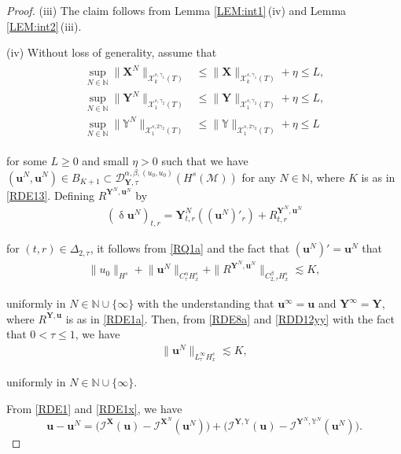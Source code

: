 \documentclass[letterpaper, 11pt,  reqno]{amsart}
\newcommand{\1}{\hspace{0.5mm}\textup{I}\hspace{0.5mm}}
\newcommand{\I}{\mathcal{I}}
\newcommand{\noi}{\noindent}
\newcommand{\D}{\mathcal{D}}
\newcommand{\al}{\alpha}
\newcommand{\be}{\beta}
\newcommand{\updl}{\updelta}
\newcommand{\Dl}{\Delta}
\newcommand{\g}{\gamma}
\newcommand{\les}{\lesssim}
\newcommand{\M}{\mathcal{M}}
\newcommand{\N}{\mathbb{N}}
\newcommand{\cX}{\mathcal{X}}
\newcommand{\uu}{\mathbf{u}}
\newcommand{\YYb}{\mathbb{Y}}
\newcommand{\XX}{\mathbf{X}}
\newcommand{\YY}{\mathbf{Y}}
\numberwithin{equation}{section}
\numberwithin{theorem}{section}
\begin{document}
\begin{proof}
\medskip


\noi
(iii) 
The claim follows from 
Lemma \ref{LEM:int1}\,(iv)
and Lemma \ref{LEM:int2}\,(iii).







\medskip




\noi
(iv) 
Without loss of generality, assume that 
\begin{align}
\begin{split}
\sup_{N \in \N} \|\XX^N\|_{\cX^{s, \g_1}_k(T)} & \le \|\XX\|_{\cX^{s, \g_1}_k(T)} + \eta
\le L, \\
\sup_{N \in \N}  \| \YY^N\|_{\cX^{s, \g_2}_1(T)}
&  \le  \| \YY\|_{\cX^{s, \g_2}_1(T)} + \eta
\le L,\\
\sup_{N \in \N}   \| \YYb^N\|_{\cX^{s, 2\g_2}_1(T)} & \le   \| \YYb\|_{\cX^{s, 2\g_2}_1(T)}+ \eta
\le L
\end{split}
\label{RDD12x}
\end{align}


\noi
for some $L\ge 0$ and small $\eta > 0$  such that 
we have
$(\uu^N, \uu^N)
\in B_{K+1} \subset \D^{\al, \be, (u_0, u_0)}_{\YY, \tau}(H^s(\M))$
for any $N \in \N$, 
where $K$ is as in \eqref{RDE13}.
Defining $R^{\YY^N, \uu^N}$ by 
\begin{align*}
(\updl \uu^N)_{t, r} = \YY^N_{t, r}((\uu^N)'_r) + R^{\YY^N, \uu^N}_{t, r}
\end{align*}

\noi
for $(t, r) \in \Dl_{2, \tau}$, 
it follows from 
\eqref{RQ1a} and the fact that $(\uu^N)' = \uu^N$
that 
\begin{align}
\| u_0 \|_{H^s} + \big\|\uu^N\big\|_{C^\al_\tau H^s_x}
+  \| R^{\YY^N, \uu^N}\|_{C^\be_{2,\tau}H^s_x}\les K , 
\label{RDD12yy}
\end{align}


\noi
uniformly in $N \in \N \cup \{\infty\}$
with the understanding that $\uu^\infty
= \uu$ and $\YY^\infty = \YY$, 
where 
  $R^{\YY, \uu}$ is as in \eqref{RDE1a}.
Then, from \eqref{RDE8a} and   \eqref{RDD12yy} with 
the fact that $0 < \tau \le 1$, we have 
\begin{align}
\|\uu^N\|_{L^\infty_\tau H^s_x} \les 
 K, 
\label{RDD12z}
\end{align}

\noi
uniformly in $N \in \N \cup \{\infty\}$.



From \eqref{RDE1} and \eqref{RDE1x}, we have 
\begin{equation}
\uu - \uu^N = \big(\I^\XX(\uu)- \I^{\XX^N}(\uu^N) \big)+ 
\big(\I^{\YY, \YYb}(\uu) -\I^{\YY^N, \YYb^N}(\uu^N)\big).
\label{RDD12}
\end{equation}


\end{proof}
\end{document}
